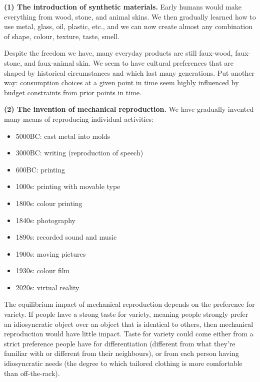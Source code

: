 \documentclass[
  11pt,
  letterpaper,
  DIV=11,
  numbers=noendperiod,
  oneside]{scrartcl}
\providecommand{\tightlist}{%
  \setlength{\itemsep}{0pt}\setlength{\parskip}{0pt}}\usepackage{longtable,booktabs,array}
\begin{document}
\textbf{(1) The introduction of synthetic materials.} Early humans would
make everything from wood, stone, and animal skins. We then gradually
learned how to use metal, glass, oil, plastic, etc., and we can now
create almost any combination of shape, colour, texture, taste, smell.

Despite the freedom we have, many everyday products are still faux-wood,
faux-stone, and faux-animal skin. We seem to have cultural preferences
that are shaped by historical circumstances and which last many
generations. Put another way: consumption choices at a given point in
time seem highly influenced by budget constraints from prior points in
time.

\textbf{(2) The invention of mechanical reproduction.} We have gradually
invented many means of reproducing individual activities:

\begin{itemize}
\tightlist
\item
  5000BC: cast metal into molds
\item
  3000BC: writing (reproduction of speech)
\item
  600BC: printing
\item
  1000s: printing with movable type
\item
  1800s: colour printing
\item
  1840s: photography
\item
  1890s: recorded sound and music
\item
  1900s: moving pictures
\item
  1930s: colour film
\item
  2020s: virtual reality
\end{itemize}

The equilibrium impact of mechanical reproduction depends on the
preference for variety. If people have a strong
taste for variety, meaning people strongly prefer an idiosyncratic
object over an object that is identical to others, then mechanical
reproduction would have little impact. Taste for variety could come
either from a strict preference people have for differentiation
(different from what they're familiar with or different from their
neighbours), or from each person having idiosyncratic needs (the degree
to which tailored clothing is more comfortable than off-the-rack).
\end{document}
